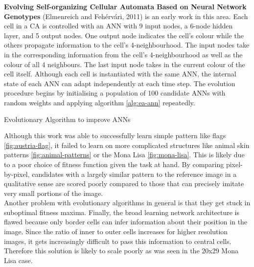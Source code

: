 \noindent
\textbf{Evolving Self-organizing Cellular Automata Based on Neural Network Genotypes} (Elmenreich and Feh\'erv\'ari, 2011) \cite{elmenreich2011evolving} is an early work in this area.
Each cell in a CA is controlled with an ANN with 9 input nodes, a 6-node hidden layer, and 5 output nodes.
One output node indicates the cell's colour while the others propagate information to the cell's 4-neighbourhood.
The input nodes take in the corresponding information from the cell's 4-neighbourhood as well as the colour of all 4 neighbours.
The last input node takes in the current colour of the cell itself.
Although each cell is instantiated with the same ANN, the internal state of each ANN can adapt independently at each time step.
The evolution procedure begins by initialising a population of 100 candidate ANNs with random weights and applying algorithm \ref{alg:ea-ann} repeatedly. 
\begin{algorithm}
\caption{Evolutionary Algorithm to improve ANNs}
\label{alg:ea-ann}
\begin{algorithmic}
\EndFor
{}
\EndFor
\end{algorithmic}
\end{algorithm}

Although this work was able to successfully learn simple pattern like flags \ref{fig:austria-flag}, it failed to learn on more complicated structures like animal skin patterns \ref{fig:animal-patterns} or the Mona Lisa \ref{fig:mona-lisa}.
This is likely due to a poor choice of fitness function given the task at hand.
By comparing pixel-by-pixel, candidates with a largely similar pattern to the reference image in a qualitative sense are scored poorly compared to those that can precisely imitate very small portions of the image.\\

Another problem with evolutionary algorithms in general is that they get stuck in suboptimal fitness maxima.
Finally, the broad learning network architecture is flawed because only border cells can infer information about their position in the image.
Since the ratio of inner to outer cells increases for higher resolution images, it gets increasingly difficult to pass this information to central cells.
Therefore this solution is likely to scale poorly as was seen in the 20x29 Mona Lisa case. \\

